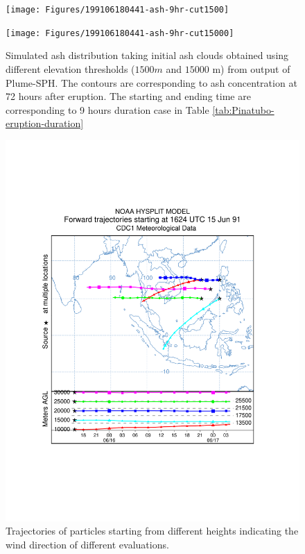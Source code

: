 \documentclass[draft,linenumbers]{agujournal2019}
\begin{document}
\begin{figure}[!htb]
    \centering
    \begin{minipage}{.325\textwidth}
        \centering
        \texttt{[image: Figures/199106180441-ash-9hr-cut1500]}
    \end{minipage}%
    \begin{minipage}{.325 \textwidth}
        \centering
        \texttt{[image: Figures/199106180441-ash-9hr-cut15000]}
    \end{minipage}%
    \caption{Simulated ash distribution taking initial ash clouds obtained using different elevation thresholds ($1500 m$ and $15000$ m) from output of Plume-SPH. The contours are corresponding to ash concentration at 72 hours after eruption. The starting and ending time are corresponding to 9 hours duration case in Table \ref{tab:Pinatubo-eruption-duration}}
    \label{fig:Puff-sensitivity-elevation-threshold}
\end{figure}

\begin{figure}[!htb]
    \centering
    \begin{minipage}{.75 \textwidth}
        \centering
        \includegraphics[width=0.99 \textwidth]{Figures/trajplot_test3_10_30K_ok}
    \end{minipage}%
    \caption{Trajectories of particles starting from different heights indicating the wind direction of different evaluations.}
    \label{fig:hysplit-1624-utc}
\end{figure}
\end{document}
